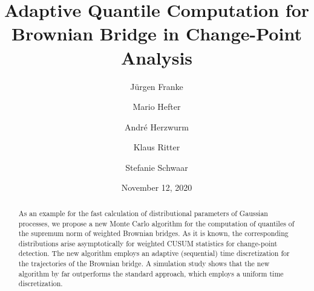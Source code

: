 \documentclass[a4paper]{amsart}
\theoremstyle{definition}
\theoremstyle{plain}
\begin{document}
\title[Adaptive Quantile Computation for Brownian Bridge]%
{Adaptive Quantile Computation for Brownian Bridge in
Change-Point Analysis}

\author[J.\ Franke]{J\"urgen Franke}
\address{Fachbereich Mathematik\\
TU Kaiserslautern\\
Postfach 3049\\
67653 Kaiserslautern\\
Germany}

\author[M.\ Hefter]{Mario Hefter}
\address{Fachbereich Mathematik\\
TU Kaiserslautern\\
Postfach 3049\\
67653 Kaiserslautern\\
Germany}

\author[A.\ Herzwurm]{Andr\'e Herzwurm}
\address{R+V Versicherung AG\\
Raiffeisenplatz 2\\
65189 Wiesbaden\\
Germany}

\author[K.\ Ritter]{Klaus Ritter}
\address{Fachbereich Mathematik\\
TU Kaiserslautern\\
Postfach 3049\\
67653 Kaiserslautern\\
Germany}

\author[S.\ Schwaar]{Stefanie Schwaar}
\address{Fraunhofer ITWM\\
Fraunhofer-Platz 1\\
67663 Kaiserslautern\\
Germany}


\date{November 12, 2020}

\begin{abstract}
As an example for the fast calculation of distributional parameters of
Gaussian processes, we propose a new Monte Carlo algorithm for the
computation of quantiles of the supremum norm of weighted Brownian
bridges. As it is known, the corresponding distributions arise
asymptotically for weighted CUSUM statistics for change-point detection.
The new algorithm employs an adaptive (sequential) time discretization
for the trajectories of the Brownian bridge. A simulation study shows
that the new algorithm by far outperforms the standard approach, which
employs a uniform time discretization.
\end{abstract}
\end{document}
